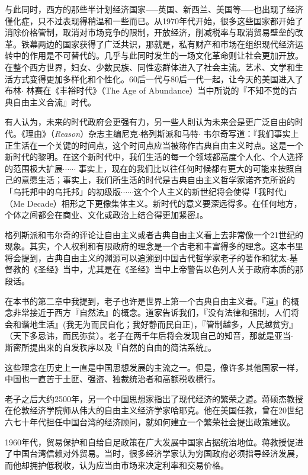 与此同时，西方的那些半计划经济国家—--英国、新西兰、美国等—--也出现了经济僅化症，只不过表现得稍温和一些而已。从1970年代开始，很多这些国家都开始了消除价格管制，取消对市场竞争的限制，开放经济，削减税率与取消贸易壁垒的改革。铁幕两边的国家获得了广泛共识，那就是，私有财产和市场在组织现代经济运转中的作用是不可替代的。几乎与此同时发生的一场文化革命则让社会更加开放。在整个西方世界，妇女、少数民族、同性恋群体进入了社会主流。艺术、文学和生活方式变得更加多样化和个性化。60后一代与80后一代一起，让今天的美国进入了布林$\cdot$ 林赛在《丰裕时代》（The Age of Abundance）当中所说的『不知不觉的古典自由主义合流』时代。

有人认为，未来的时代政府会更强有力，另一些人則认为未来会是更广泛自由的时代。《理由》（\textit{Reason}）杂志主编尼克$\cdot$格列斯派和马特$\cdot$ 韦尔奇写道：『我们事实上正生活在一个关键的时间点，这个时间点应当被称作古典自由主义时点。这是一个新时代的黎明。在这个新时代中，我们生活的每一个领域都高度个人化、个人选择的范围极大扩展$\cdots \cdots$ 事实上，现在的我们比以往任何时候都有更大的可能来按照自己的意愿生活；事实上，我们所生活的时代是古典自由主义哲学家诺齐克所说的「乌托邦中的乌托邦」的初级版$\cdots \cdots$这个个人主义的新世纪将会使得「我时代」（Me Decade）相形之下更像集体主义。新时代的意义要深远得多。在任何地方，个体之间都会在商业、文化或政治上结合得更加紧密』。

格列斯派和韦尔奇的评论让自由主义或者古典自由主义看上去非常像一个21世纪的现象。其实，个人权利和有限政府的理念是一个古老和丰富得多的理念。这本书里将会提到，古典自由主义的渊源可以追溯到中国古代哲学家老子的著作和犹太-基督教的《圣经》当中，尤其是在《圣经》当中上帝警告以色列人关于政府本质的那段话。

在本书的第二章中我提到，老子也许是世界上第一个古典自由主义者。『道』的概念非常接近于西方『自然法』的概念。道家告诉我们，『没有法律和强制，人们将会和谐地生活』(我无为而民自化；我好静而民自正)，『管制越多，人民越贫穷』（天下多忌讳，而民弥贫）。老子在两千年后将会发现自己的知音，那就是亚当$\cdot$ 斯密所提出来的自发秩序以及『自然的自由的简沽系统』。

这些理念在历史上一直是中国思想发展的主流之一。但是，像许多其他国家一样，中国也一直苦于土匪、强盗、独裁统治者和高额税收横行。

老子之后大约2500年，另一个中国思想家指出了现代经济的繁荣之道。蒋硕杰教授在伦敦经济学院师从伟大的自由主义经济学家哈耶克。他在美国任教，曾在20世纪六七十年代担任中国台湾的经济顾问，就如何建立一个繁荣社会提出政策建议。

1960年代，贸易保护和自给自足政策在广大发展中国家占据统治地位。蒋教授促进了中国台湾信赖对外贸易。当时，很多经济学家认为穷国政府必须指导经济发展，而他却拥护低税收，认为应当由市场来决定利率和交易价格。

